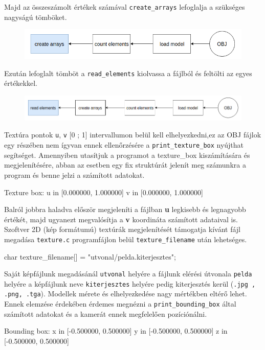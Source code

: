 Majd az összeszámolt értékek számával \texttt{create\_arrays} lefoglalja a szükséges nagyságú tömböket.
\bigskip
\begin{figure}[h]
\centering
\includegraphics[scale=0.5]{images/create.png}
\end{figure}
\bigskip
\newpage
Ezután lefoglalt tömböt  a \texttt{read\_elements} kiolvassa a fájlból és feltölti az egyes értékekkel.
\bigskip
\begin{figure}[h]
\centering
\includegraphics[scale=0.5]{images/read.png}
\end{figure}
Textúra pontok \texttt{u}, \texttt{v} [0 ; 1] intervallumon belül kell elhelyezkedni,ez az OBJ fájlok egy részében nem ígyvan ennek ellenőrzésére  a  \texttt{print\_texture\_box} nyújthat segítséget. Amennyiben utasítjuk a programot  a texture\_box kiszámítására és megjelenítésére, abban az esetben egy fix struktúrát jelenít meg számunkra a program és benne jelzi a számított adatokat.
\bigskip
\begin{python}
Texture box:
u in [0.000000, 1.000000]
v in [0.000000, 1.000000]
\end{python}
\bigskip

Balról jobbra haladva először megjeleníti a fájlban \textbf{u} legkisebb és legnagyobb értékét, majd ugyanezt megvalósítja a \textbf{v} koordináta számított adataival is.\\

Szoftver 2D (kép formátumú) textúrák megjelenítését támogatja  kívánt fájl megadása \texttt{texture.c} programfájlon belül \texttt{texture\_filename} után lehetséges.
\bigskip
\begin{cpp}
char texture_filename[] = "utvonal/pelda.kiterjesztes";
\end{cpp}
\bigskip

Saját képfájlunk megadásánál \texttt{utvonal} helyére a fájlunk elérési útvonala \texttt{pelda} helyére a képfájlunk neve \texttt{kiterjesztes} helyére pedig kiterjesztés kerül (\texttt{.jpg , .png, .tga}).
Modellek mérete és elhelyezkedése nagy mértékben eltérő lehet. Ennek elemzése érdekében érdemes megnézni a \texttt{print\_bounding\_box} által számított adatokat és a kamerát ennek megfelelően pozíciónálni.
\bigskip
\begin{python}
Bounding box:
x in [-0.500000, 0.500000]
y in [-0.500000, 0.500000]
z in [-0.500000, 0.500000]
\end{python}
\bigskip

